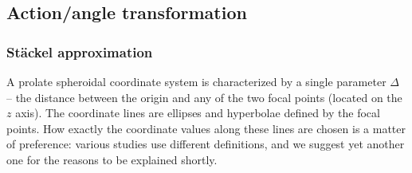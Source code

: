 \documentclass[12pt]{article}
\begin{document}
\subsection{Action/angle transformation}  \label{sec:ActionsDetails}

\subsubsection{St\"ackel approximation}  \label{sec:ActionsStaeckelDetails}

A prolate spheroidal coordinate system is characterized by a single parameter $\Delta$ -- the distance between the origin and any of the two focal points (located on the $z$ axis). The coordinate lines are ellipses and hyperbolae defined by the focal points. How exactly the coordinate values along these lines are chosen is a matter of preference: various studies use different definitions, and we suggest yet another one for the reasons to be explained shortly. 
\end{document}
